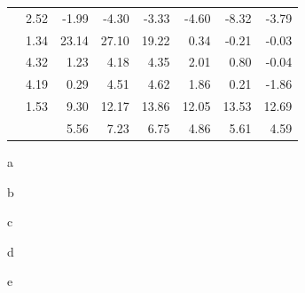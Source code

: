 \begin{table}[ht]
{\begin{tabular}{ld{1.2}d{3.2}d{3.2}d{3.2}d{3.2}d{3.2}d{3.2}}
   & 2.52 & -1.99 & -4.30 & -3.33 & -4.60     & -8.32        & -3.79       \\
            & 1.34 & 23.14 & 27.10 & 19.22 & 0.34      & -0.21        & -0.03       \\
   & 4.32 & 1.23  & 4.18  & 4.35  & 2.01      & 0.80         & -0.04       \\
   & 4.19 & 0.29  & 4.51  & 4.62  & 1.86      & 0.21         & -1.86       \\
            & 1.53 & 9.30  & 12.17 & 13.86 & 12.05     & 13.53        & 12.69       \\
  \midrule
            &      & 5.56  & 7.23  & 6.75  & 4.86      & 5.61         & 4.59        \\
  \bottomrule
  \end{tabular}
}{
  \item[a] 
  \item[b] 
  \item[c] 
  \item[d] 
  \item[e] 
}
\end{table}

\clearpage

